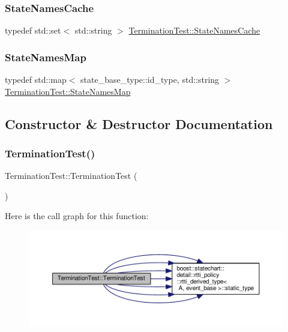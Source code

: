 \subsubsection{\texorpdfstring{State\+Names\+Cache}{StateNamesCache}}
{\footnotesize\ttfamily typedef std\+::set$<$ std\+::string $>$ \mbox{\hyperlink{struct_termination_test_a410a8e606d2928905c6fffcafaf34bbb}{Termination\+Test\+::\+State\+Names\+Cache}}\hspace{0.3cm}{\ttfamily [private]}}

\mbox{\label{struct_termination_test_ad548ac63b569644d5f8a7fcc452a1729}} 
\subsubsection{\texorpdfstring{State\+Names\+Map}{StateNamesMap}}
{\footnotesize\ttfamily typedef std\+::map$<$ state\+\_\+base\+\_\+type\+::id\+\_\+type, std\+::string $>$ \mbox{\hyperlink{struct_termination_test_ad548ac63b569644d5f8a7fcc452a1729}{Termination\+Test\+::\+State\+Names\+Map}}\hspace{0.3cm}{\ttfamily [private]}}



\subsection{Constructor \& Destructor Documentation}
\mbox{\label{struct_termination_test_a2e83202c5a675dfefb03e1854566218b}} 
\subsubsection{\texorpdfstring{Termination\+Test()}{TerminationTest()}}
{\footnotesize\ttfamily Termination\+Test\+::\+Termination\+Test (\begin{DoxyParamCaption}{ }\end{DoxyParamCaption})}

Here is the call graph for this function\+:
\nopagebreak
\begin{figure}[H]
\begin{center}
\leavevmode
\includegraphics[width=350pt]{struct_termination_test_a2e83202c5a675dfefb03e1854566218b_cgraph}
\end{center}
\end{figure}


